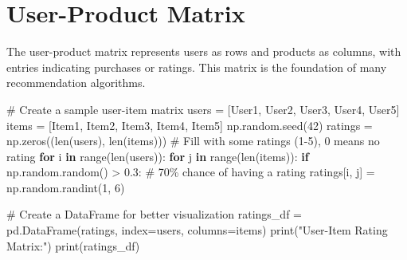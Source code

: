 \documentclass[
  letterpaper,
  DIV=11,
  numbers=noendperiod]{scrreprt}
\newenvironment{Shaded}{\begin{snugshade}}{\end{snugshade}}
\newcommand{\BuiltInTok}[1]{\textcolor[rgb]{0.00,0.23,0.31}{#1}}
\newcommand{\CommentTok}[1]{\textcolor[rgb]{0.37,0.37,0.37}{#1}}
\newcommand{\ControlFlowTok}[1]{\textcolor[rgb]{0.00,0.23,0.31}{\textbf{#1}}}
\newcommand{\DecValTok}[1]{\textcolor[rgb]{0.68,0.00,0.00}{#1}}
\newcommand{\FloatTok}[1]{\textcolor[rgb]{0.68,0.00,0.00}{#1}}
\newcommand{\KeywordTok}[1]{\textcolor[rgb]{0.00,0.23,0.31}{\textbf{#1}}}
\newcommand{\NormalTok}[1]{\textcolor[rgb]{0.00,0.23,0.31}{#1}}
\newcommand{\OperatorTok}[1]{\textcolor[rgb]{0.37,0.37,0.37}{#1}}
\newcommand{\StringTok}[1]{\textcolor[rgb]{0.13,0.47,0.30}{#1}}
\begin{document}
\section{User-Product Matrix}\label{user-product-matrix}

The user-product matrix represents users as rows and products as
columns, with entries indicating purchases or ratings. This matrix is
the foundation of many recommendation algorithms.

\begin{Shaded}
\begin{Highlighting}[]
\CommentTok{\# Create a sample user{-}item matrix}
\NormalTok{users }\OperatorTok{=}\NormalTok{ [}\StringTok{\textquotesingle{}User1\textquotesingle{}}\NormalTok{, }\StringTok{\textquotesingle{}User2\textquotesingle{}}\NormalTok{, }\StringTok{\textquotesingle{}User3\textquotesingle{}}\NormalTok{, }\StringTok{\textquotesingle{}User4\textquotesingle{}}\NormalTok{, }\StringTok{\textquotesingle{}User5\textquotesingle{}}\NormalTok{]}
\NormalTok{items }\OperatorTok{=}\NormalTok{ [}\StringTok{\textquotesingle{}Item1\textquotesingle{}}\NormalTok{, }\StringTok{\textquotesingle{}Item2\textquotesingle{}}\NormalTok{, }\StringTok{\textquotesingle{}Item3\textquotesingle{}}\NormalTok{, }\StringTok{\textquotesingle{}Item4\textquotesingle{}}\NormalTok{, }\StringTok{\textquotesingle{}Item5\textquotesingle{}}\NormalTok{]}
\NormalTok{np.random.seed(}\DecValTok{42}\NormalTok{)}
\NormalTok{ratings }\OperatorTok{=}\NormalTok{ np.zeros((}\BuiltInTok{len}\NormalTok{(users), }\BuiltInTok{len}\NormalTok{(items)))}
\CommentTok{\# Fill with some ratings (1{-}5), 0 means no rating}
\ControlFlowTok{for}\NormalTok{ i }\KeywordTok{in} \BuiltInTok{range}\NormalTok{(}\BuiltInTok{len}\NormalTok{(users)):}
    \ControlFlowTok{for}\NormalTok{ j }\KeywordTok{in} \BuiltInTok{range}\NormalTok{(}\BuiltInTok{len}\NormalTok{(items)):}
        \ControlFlowTok{if}\NormalTok{ np.random.random() }\OperatorTok{\textgreater{}} \FloatTok{0.3}\NormalTok{:  }\CommentTok{\# 70\% chance of having a rating}
\NormalTok{            ratings[i, j] }\OperatorTok{=}\NormalTok{ np.random.randint(}\DecValTok{1}\NormalTok{, }\DecValTok{6}\NormalTok{)}

\CommentTok{\# Create a DataFrame for better visualization}
\NormalTok{ratings\_df }\OperatorTok{=}\NormalTok{ pd.DataFrame(ratings, index}\OperatorTok{=}\NormalTok{users, columns}\OperatorTok{=}\NormalTok{items)}
\BuiltInTok{print}\NormalTok{(}\StringTok{"User{-}Item Rating Matrix:"}\NormalTok{)}
\BuiltInTok{print}\NormalTok{(ratings\_df)}


\end{Highlighting}
\end{Shaded}
\end{document}
